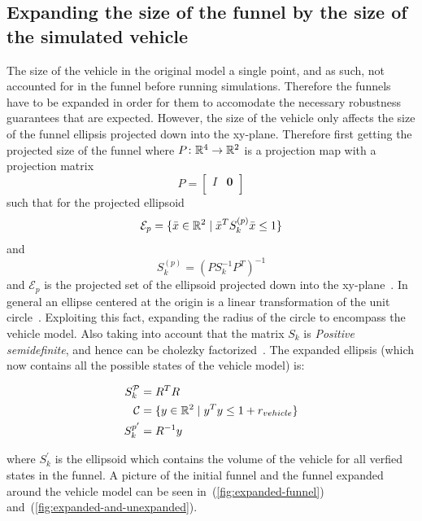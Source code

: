 \subsection{Expanding the size of the funnel by the size of the simulated
  vehicle}

The size of the vehicle in the original model a single point, and as such, not
accounted for in the funnel before running simulations. Therefore the funnels
have to be expanded in order for them to accomodate the necessary robustness
guarantees that are expected. However, the size of the vehicle only affects the
size of the funnel ellipsis projected down into the xy-plane. Therefore first
getting the projected size of the funnel where \(P \colon \mathbb{R}^4 \rightarrow
\mathbb{R}^2\) is a projection map with a projection matrix
\[
  P =
  \begin{bmatrix}
    I & \mathbf{0} \\
  \end{bmatrix}
\]
such that for the projected ellipsoid
\[
  \mathcal{E}_{p} = \lbrace\bar{x} \in \mathbb{R}^{2} \mid {\bar{x}}^{T}S_{k}^{(p)}\bar{x}
    \leq 1\rbrace
\]
and
\[
  S_{k}^{(p)} = \left( PS_{k}^{-1}P^T \right)^{-1}
\]
and \(\mathcal{E}_{p}\) is the projected set of the ellipsoid projected down
into the xy-plane~\cite{majumdarFunnelLibrariesRealtime2017}. In general an
ellipse centered at the origin is a linear transformation of the unit
circle~\cite{lay2005linear}. Exploiting this fact, expanding the radius of the
circle to encompass the vehicle model. Also taking into account that the matrix
\(S_{k}\) is \textit{Positive semidefinite}, and hence can be cholezky
factorized~\cite{lay2005linear}. The expanded ellipsis (which now contains all
the possible states of the vehicle model) is:

\begin{align*}
  S_{k}^{\mathcal{P}} &= R^{T}R \\
  \mathcal{C} &= \lbrace y \in \mathbb{R}^2 \mid y^{T}y \leq 1 + r_{vehicle}\rbrace \\
  S_{k}^{p'} &= R^{-1}y \\
\end{align*}

where \(S_{k}^{'}\) is the ellipsoid which contains the volume of the vehicle
for all verfied states in the funnel. A picture of the initial funnel and the
funnel expanded around the vehicle model can be seen
in~(\ref{fig:expanded-funnel}) and~(\ref{fig:expanded-and-unexpanded}).

